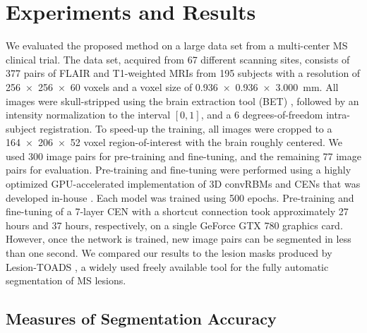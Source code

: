 
\section{Experiments and Results}



We evaluated the proposed method on a large data set from a multi-center MS
clinical trial. The data set, acquired from 67 different scanning sites,
consists of 377 pairs of FLAIR and T1-weighted MRIs from 195 subjects with a
resolution of \num{256x256x60} voxels and a voxel size of
\SI{0.936x0.936x3.000}{\milli\metre}. All images were skull-stripped using the
brain extraction tool (BET) \cite{jenkinson2005bet2}, followed by an intensity
normalization to the interval $[0,1]$, and a 6 degrees-of-freedom intra-subject
registration. To speed-up the training, all images were cropped to a
\num{164x206x52} voxel region-of-interest with the brain roughly centered. We
used 300 image pairs for pre-training and fine-tuning, and the remaining 77
image pairs for evaluation. Pre-training and fine-tuning were performed using a
highly optimized GPU-accelerated implementation of 3D convRBMs and CENs that was
developed in-house \cite{brosch2014efficient}. Each model was trained using 500
epochs. Pre-training and fine-tuning of a 7-layer CEN with a shortcut connection
took approximately 27 hours and 37 hours, respectively, on a single GeForce GTX
780 graphics card. However, once the network is trained, new image pairs can be
segmented in less than one second. We compared our results to the lesion masks
produced by Lesion-TOADS \cite{shiee2010topology}, a widely used freely
available tool for the fully automatic segmentation of MS lesions.

\subsection{Measures of Segmentation Accuracy}

